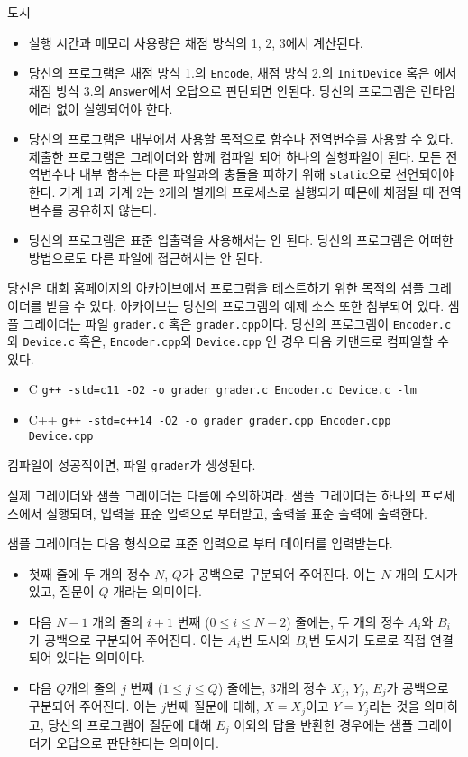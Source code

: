 \begin{problem}{도시}
	\Notes
	
	\begin{itemize}
		\item 실행 시간과 메모리 사용량은 채점 방식의 1, 2, 3에서 계산된다.
		\item 당신의 프로그램은 채점 방식 1.의 \texttt{Encode}, 채점 방식 2.의 \texttt{InitDevice} 혹은 에서 채점 방식 3.의 \texttt{Answer}에서 오답으로 판단되면 안된다. 당신의 프로그램은 런타임 에러 없이 실행되어야 한다.
		\item 당신의 프로그램은 내부에서 사용할 목적으로 함수나 전역변수를 사용할 수 있다. 제출한 프로그램은 그레이더와 함께 컴파일 되어 하나의 실행파일이 된다. 모든 전역변수나 내부 함수는 다른 파일과의 충돌을 피하기 위해 \texttt{static}으로 선언되어야 한다. 기계 1과 기계 2는 2개의 별개의 프로세스로 실행되기 때문에 채점될 때 전역변수를 공유하지 않는다.
		\item 당신의 프로그램은 표준 입출력을 사용해서는 안 된다. 당신의 프로그램은 어떠한 방법으로도 다른 파일에 접근해서는 안 된다. 
	\end{itemize}
	
	당신은 대회 홈페이지의 아카이브에서 프로그램을 테스트하기 위한 목적의 샘플 그레이더를 받을 수 있다. 아카이브는 당신의 프로그램의 예제 소스 또한 첨부되어 있다.
	샘플 그레이더는 파일 \texttt{grader.c} 혹은 \texttt{grader.cpp}이다. 당신의 프로그램이 \texttt{Encoder.c}와 \texttt{Device.c} 혹은, \texttt{Encoder.cpp}와 \texttt{Device.cpp} 인 경우 다음 커맨드로 컴파일할 수 있다.
	
	\begin{itemize}
		\item C
		\texttt{g++ -std=c11 -O2 -o grader grader.c Encoder.c Device.c -lm}
		\item C++
		\texttt{g++ -std=c++14 -O2 -o grader grader.cpp Encoder.cpp Device.cpp }
	\end{itemize}
	
	컴파일이 성공적이면, 파일 \texttt{grader}가 생성된다.
	
	실제 그레이더와 샘플 그레이더는 다름에 주의하여라. 샘플 그레이더는 하나의 프로세스에서 실행되며, 입력을 표준 입력으로 부터받고, 출력을 표준 출력에 출력한다.
	
	\InputFile
	
	샘플 그레이더는 다음 형식으로 표준 입력으로 부터 데이터를 입력받는다.
	
	\begin{itemize}
		\item 첫째 줄에 두 개의 정수 $N$, $Q$가 공백으로 구분되어 주어진다. 이는 $N$ 개의 도시가 있고, 질문이 $Q$ 개라는 의미이다.
		\item 다음 $N-1$ 개의 줄의 $i+1$ 번째 ($0 \le i \le N-2$) 줄에는, 두 개의 정수 $A_i$와 $B_i$가 공백으로 구분되어 주어진다. 이는 $A_i$번 도시와 $B_i$번 도시가 도로로 직접 연결되어 있다는 의미이다.
		\item 다음 $Q$개의 줄의 $j$ 번째 ($1 \le j \le Q$) 줄에는, 3개의 정수 $X_j$, $Y_j$, $E_j$가 공백으로 구분되어 주어진다. 이는 $j$번째 질문에 대해, $X=X_j$이고 $Y=Y_j$라는 것을 의미하고, 당신의 프로그램이 질문에 대해 $E_j$ 이외의 답을 반환한 경우에는 샘플 그레이더가 오답으로 판단한다는 의미이다.
	\end{itemize}
	

\end{problem}
